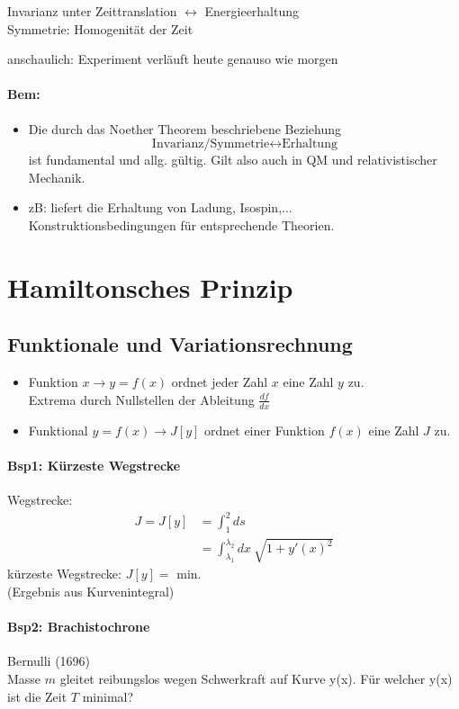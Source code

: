 \documentclass[titlepage,12pt,a4paper,ngerman]{report}
\newcommand{\tx}[1]{\textrm{#1}}
\newcommand{\rbox}[1]{\begin{tcolorbox}[colback=white,colframe=red!75!black]#1\end{tcolorbox}} %
\begin{document}
{\rbox{Invarianz unter Zeittranslation $\leftrightarrow$ Energieerhaltung\\
	Symmetrie: Homogenität der Zeit}
anschaulich: Experiment verläuft heute genauso wie morgen
\paragraph{Bem:}
\begin{itemize}
	\item Die durch das Noether Theorem beschriebene Beziehung
	$$\tx{Invarianz/Symmetrie} \leftrightarrow \tx{Erhaltung}$$
	ist fundamental und allg. gültig. Gilt also auch in QM und relativistischer Mechanik.
	\item zB: liefert die Erhaltung von Ladung, Isospin,...\\
	Konstruktionsbedingungen für entsprechende Theorien.
\end{itemize}

\section{Hamiltonsches Prinzip}
\setcounter{equation}{0}
\subsection{Funktionale und Variationsrechnung}
\begin{itemize}
	\item Funktion $x \rightarrow y = f(x)$ ordnet jeder Zahl $x$ eine Zahl $y$ zu.\\
	Extrema durch Nullstellen der Ableitung $\frac{df}{dx}$
	\item Funktional $y = f(x) \rightarrow J[y]$ ordnet einer Funktion $f(x)$ eine Zahl $J$ zu.
\end{itemize}
\paragraph{Bsp1: Kürzeste Wegstrecke} %
Wegstrecke: 
\begin{align*}
J = J[y] &= \int_1^2 ds\\
&=\int_{\lambda_1}^{\lambda_2} dx\ \sqrt{1+ y'(x)^2}
\end{align*}
kürzeste Wegstrecke: $J[y] = \tx{ min.}$\\
(Ergebnis aus Kurvenintegral)
\paragraph{Bsp2: Brachistochrone} Bernulli (1696)\\ %
Masse $m$ gleitet reibungslos wegen Schwerkraft auf Kurve y(x). Für welcher y(x) ist die Zeit $T$ minimal?\\

}
\end{document}
